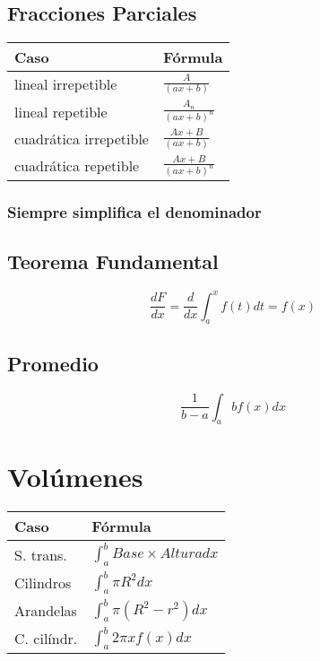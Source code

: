 \documentclass[11pt]{article}
\begin{document}
\begin{multicols}{3}
\subsection{Fracciones Parciales}
\label{sec-2-8}

\begin{center}
\begin{tabular}{ll}
Caso & Fórmula\\
\hline
lineal irrepetible & $\frac{A}{(ax+b)}$\\
lineal repetible & $\frac{A_{n}}{(ax+b)^n}$\\
cuadrática irrepetible & $\frac{Ax + B}{(ax+b)}$\\
cuadrática repetible & $\frac{Ax + B}{(ax+b)^n}$\\
\end{tabular}
\end{center}

\subsubsection{Siempre simplifica el denominador}
\label{sec-2-8-1}

\subsection{Teorema Fundamental}
\label{sec-2-9}
\[ \frac{dF}{dx} = \frac{d}{dx}\int_{a}^{x}f(t)dt=f(x)\]

\subsection{Promedio}
\label{sec-2-10}
\[\frac{1}{b-a} \int_{a}{b}f(x)dx\]
\section{Volúmenes}
\label{sec-2-11}
\begin{center}
\begin{tabular}{ll}
Caso & Fórmula\\
\hline
S. trans. & $\int_{a}^{b} Base \times Altura dx$\\
Cilindros & $\int_{a}^{b}\pi R^2 dx$\\
Arandelas & $\int_{a}^{b}\pi(R^2 - r^2) dx$\\
C. cilíndr. & $\int_{a}^{b}2\pi x f(x)  dx$\\
\end{tabular}
\end{center}


\end{multicols}
\end{document}
